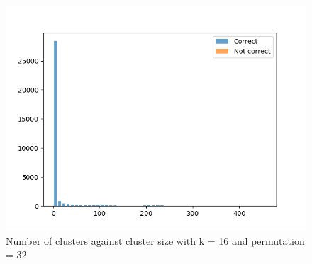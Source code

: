 \documentclass[11pt]{article}
\begin{document}
\begin{figure}[H]
	\centering
	\includegraphics[width = .8\textwidth]{virus_reads_k16_32_cluster.png}
	\caption{Number of clusters against cluster size with k = 16 and permutation = 32}
	\label{fig1}	
\end{figure}
\end{document}

